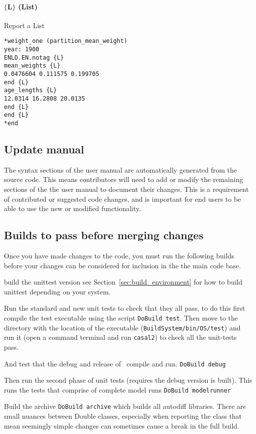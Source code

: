 \paragraph*{$\{$L$\}$ (List)}
Report a List
{\small{\begin{verbatim}
*weight_one (partition_mean_weight)
year: 1900
ENLD.EN.notag {L}
mean_weights {L}
0.0476604 0.111575 0.199705
end {L}
age_lengths {L}
12.0314 16.2808 20.0135
end {L}
end {L}
*end
\end{verbatim}}}

\subsection{Update manual}
The syntax sections of the user manual are automatically generated from the source code. This means contributors will need to add or modify the remaining sections of the the user manual to document their changes. This is a requirement of contributed or suggested code changes, and is important for end users to be able to use the new or modified functionality.

\subsection{Builds to pass before merging changes}

Once you have made changes to the code, you must run the following builds before your changes can be considered for inclusion in the the main code base. 

build the unittest version see Section~\ref{sec:build_environment} for how to build unittest depending on your system.

Run the standard and new unit tests to check that they all pass, to do this first compile the test executable using the script \texttt{DoBuild test}. Then move to the directory with the location of the executable (\texttt{BuildSystem/bin/OS/test}) and run it (open a command terminal and run \texttt{casal2}) to check all the unit-tests pass.

And test that the debug and release of \CNAME\ compile and run.
\texttt{DoBuild debug}

Then run the second phase of unit tests (requires the debug version is built). This runs the tests that comprise of complete model runs
\texttt{DoBuild modelrunner}

Build the archive 
\texttt{DoBuild archive} which builds all autodiff libraries. There are small nuances between Double classes, especially when reporting the class that mean seemingly simple changes can sometimes cause a break in the full build.


